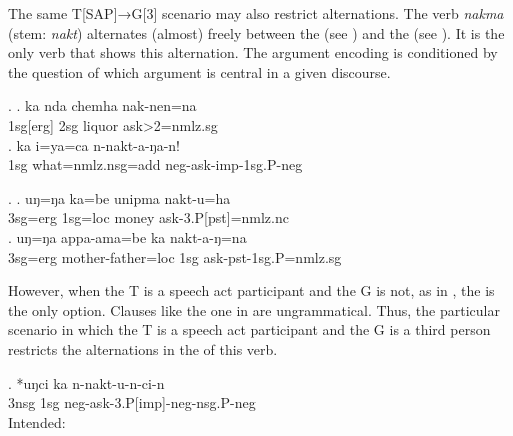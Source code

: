The same T[SAP]→G[3] scenario may also restrict alternations.  The verb \emph{nakma} (stem: \emph{nakt})  alternates (almost) freely between the  (see \Next) and the  (see \NNext). It is the only verb that shows this alternation. The argument encoding is conditioned by the question of which argument is central in a given discourse.

	 \ex. \ag.  ka nda chemha nak-nen=na\\
	{\sc 1sg[erg]} 	 {\sc 2sg}  liquor ask{>2=nmlz.sg}	\\
	 \bg. ka i=ya=ca n-nakt-a-ŋa-n!\\ 
	{\sc 1sg}  what{\sc =nmlz.nsg=add} {\sc neg-}ask{\sc -imp-1sg.P-neg}		\\ 
	    
	
\ex. \ag. uŋ=ŋa ka=be unipma nakt-u=ha\\
		{\sc 3sg=erg} {\sc 1sg=loc}  money   ask{\sc -3.P[pst]=nmlz.nc}	\\
 	\bg. uŋ=ŋa appa-ama=be ka nakt-a-ŋ=na\\
	{\sc 3sg=erg} mother-father{\sc =loc}  {\sc 1sg}	ask{\sc -pst-1sg.P=nmlz.sg}	\\

However, when the T is a speech act participant and the G is not, as in \Last[b], the  is the only option. Clauses like the one in \Next are ungrammatical. Thus, the particular scenario in which the T is a speech act participant and the G is a third person restricts the alternations in the  of this verb.

\exg. *uŋci ka n-nakt-u-n-ci-n\\
	{\sc 3nsg} {\sc 1sg} {\sc neg-}ask{\sc -3.P[imp]-neg-nsg.P-neg}\\
	Intended:   


